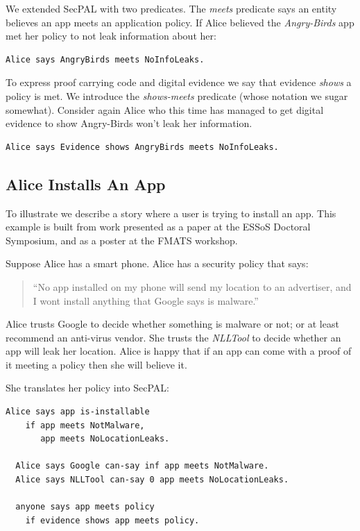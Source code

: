 \documentclass[a4paper,sfsidenotes]{tufte-book}
\begin{document}
We extended SecPAL with two predicates.  The \emph{meets}
predicate says an entity believes an app meets an application
policy.  If Alice believed the \emph{Angry-Birds} app met her
policy to not leak information about her:

\begin{lstlisting}[language=SecPAL]
Alice says AngryBirds meets NoInfoLeaks.
\end{lstlisting}

To express proof carrying code\cite{Necula:1996tr} and digital
evidence we say that evidence \emph{shows} a policy is met.  
We introduce the \emph{shows-meets} predicate (whose notation we sugar
somewhat).  Consider again Alice who this time has managed to get
digital evidence to show Angry-Birds won't leak her information.

\begin{lstlisting}[language=SecPAL]
Alice says Evidence shows AngryBirds meets NoInfoLeaks.
\end{lstlisting}

\subsection{Alice Installs An App}

To illustrate we describe a story
where a user is trying to install an app.  This example is
built from work presented as a paper at the ESSoS Doctoral
Symposium\cite{Hallett:2014un}, and as a poster at the FMATS workshop.

Suppose Alice has a smart phone.  Alice has a security policy that says:

\begin{quote}
    ``No app installed on my phone will send my location to an advertiser, and I
      wont install anything that Google says is malware.''
\end{quote}

Alice trusts Google to decide whether something is malware or not; or at least
recommend an anti-virus vendor. She trusts the \emph{NLLTool} to decide whether
an app will leak her location.  Alice is happy that if an app can come with a
proof of it meeting a policy then she will believe it.

She translates her policy into SecPAL:

\begin{lstlisting}[language=SecPAL]
  Alice says app is-installable 
    if app meets NotMalware, 
       app meets NoLocationLeaks.

  Alice says Google can-say inf app meets NotMalware.
  Alice says NLLTool can-say 0 app meets NoLocationLeaks.

  anyone says app meets policy
    if evidence shows app meets policy.
\end{lstlisting}
\end{document}

